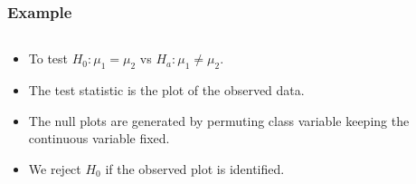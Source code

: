 \documentclass{beamer}
\begin{document}
\begin{frame}
  \frametitle{Example}
  
	\begin{columns}
	
		\begin{column}{0.4\textwidth}
		  \begin{itemize}
			  \item To test $H_0: \mu_1 = \mu_2$ vs $H_a: \mu_1 \ne \mu_2.$
			  \item The test statistic is the plot of the observed data.
			  \item The null plots are generated by permuting class variable keeping the continuous variable fixed.			
			    \item We reject $H_0$ if the observed plot is identified.		
		 \end{itemize}		
		\end{column}
		
		\begin{column}{0.6\textwidth}
			 \begin{center}  \end{center}
		\end{column}
		
	\end{columns} 
	
\end{frame}
\end{document}
